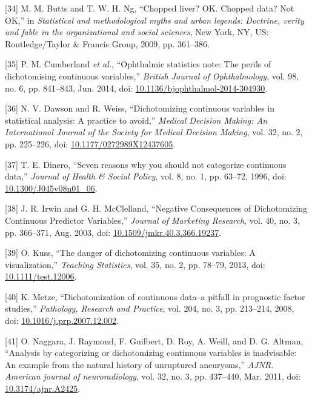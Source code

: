 \documentclass[
]{article}
\newenvironment{cslreferences}%
  {}%
  {\par}
\begin{document}
\begin{cslreferences}
\leavevmode\hypertarget{ref-butts_chopped_2009-1}{}%
{[}34{]} M. M. Butts and T. W. H. Ng, ``Chopped liver? OK. Chopped data? Not OK,'' in \emph{Statistical and methodological myths and urban legends: Doctrine, verity and fable in the organizational and social sciences}, New York, NY, US: Routledge/Taylor \& Francis Group, 2009, pp. 361--386.

\leavevmode\hypertarget{ref-cumberland_ophthalmic_2014-1}{}%
{[}35{]} P. M. Cumberland \emph{et al.}, ``Ophthalmic statistics note: The perils of dichotomising continuous variables,'' \emph{British Journal of Ophthalmology}, vol. 98, no. 6, pp. 841--843, Jun. 2014, doi: \href{https://doi.org/10.1136/bjophthalmol-2014-304930}{10.1136/bjophthalmol-2014-304930}.

\leavevmode\hypertarget{ref-dawson_dichotomizing_2012-1}{}%
{[}36{]} N. V. Dawson and R. Weiss, ``Dichotomizing continuous variables in statistical analysis: A practice to avoid,'' \emph{Medical Decision Making: An International Journal of the Society for Medical Decision Making}, vol. 32, no. 2, pp. 225--226, doi: \href{https://doi.org/10.1177/0272989X12437605}{10.1177/0272989X12437605}.

\leavevmode\hypertarget{ref-dinero_seven_1996-1}{}%
{[}37{]} T. E. Dinero, ``Seven reasons why you should not categorize continuous data,'' \emph{Journal of Health \& Social Policy}, vol. 8, no. 1, pp. 63--72, 1996, doi: \href{https://doi.org/10.1300/J045v08n01_06}{10.1300/J045v08n01\_06}.

\leavevmode\hypertarget{ref-irwin_negative_2003}{}%
{[}38{]} J. R. Irwin and G. H. McClelland, ``Negative Consequences of Dichotomizing Continuous Predictor Variables,'' \emph{Journal of Marketing Research}, vol. 40, no. 3, pp. 366--371, Aug. 2003, doi: \href{https://doi.org/10.1509/jmkr.40.3.366.19237}{10.1509/jmkr.40.3.366.19237}.

\leavevmode\hypertarget{ref-kuss_danger_2013}{}%
{[}39{]} O. Kuss, ``The danger of dichotomizing continuous variables: A visualization,'' \emph{Teaching Statistics}, vol. 35, no. 2, pp. 78--79, 2013, doi: \href{https://doi.org/10.1111/test.12006}{10.1111/test.12006}.

\leavevmode\hypertarget{ref-metze_dichotomization_2008}{}%
{[}40{]} K. Metze, ``Dichotomization of continuous data--a pitfall in prognostic factor studies,'' \emph{Pathology, Research and Practice}, vol. 204, no. 3, pp. 213--214, 2008, doi: \href{https://doi.org/10.1016/j.prp.2007.12.002}{10.1016/j.prp.2007.12.002}.

\leavevmode\hypertarget{ref-naggara_analysis_2011}{}%
{[}41{]} O. Naggara, J. Raymond, F. Guilbert, D. Roy, A. Weill, and D. G. Altman, ``Analysis by categorizing or dichotomizing continuous variables is inadvisable: An example from the natural history of unruptured aneurysms,'' \emph{AJNR. American journal of neuroradiology}, vol. 32, no. 3, pp. 437--440, Mar. 2011, doi: \href{https://doi.org/10.3174/ajnr.A2425}{10.3174/ajnr.A2425}.


\end{cslreferences}
\end{document}
